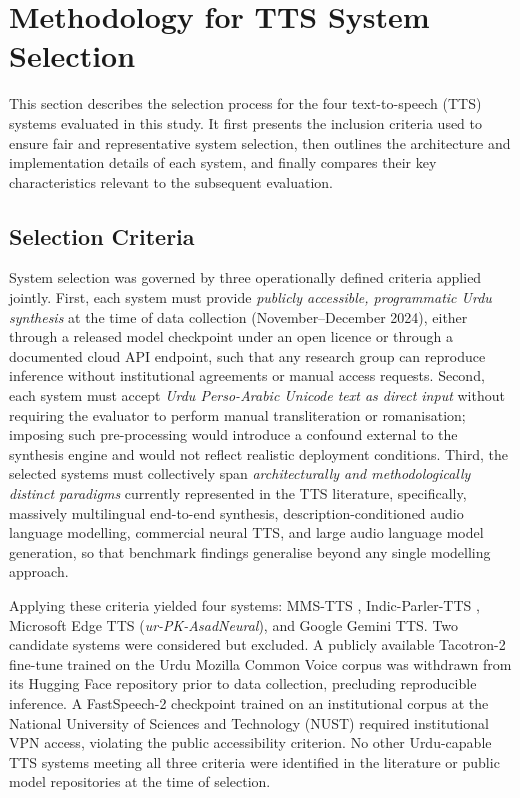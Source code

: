 \documentclass[a4paper,fleqn]{cas-dc}
\begin{document}
    \section{Methodology for TTS System Selection}\label{sec:systems}

    This section describes the selection process for the four text-to-speech (TTS) systems evaluated in this study. It first presents the inclusion criteria used to ensure fair and representative system selection, then outlines the architecture and implementation details of each system, and finally compares their key characteristics relevant to the subsequent evaluation.

    \subsection{Selection Criteria}\label{sec:systems-criteria}
    
    System selection was governed by three operationally defined criteria applied
    jointly. First, each system must provide \emph{publicly accessible, programmatic
    Urdu synthesis} at the time of data collection (November--December 2024), either
    through a released model checkpoint under an open licence or through a documented
    cloud API endpoint, such that any research group can reproduce inference without
    institutional agreements or manual access requests. Second, each system must
    accept \emph{Urdu Perso-Arabic Unicode text as direct input} without requiring
    the evaluator to perform manual transliteration or romanisation; imposing such
    pre-processing would introduce a confound external to the synthesis engine and
    would not reflect realistic deployment conditions. Third, the selected systems
    must collectively span \emph{architecturally and methodologically distinct
    paradigms} currently represented in the TTS literature, specifically,
    massively multilingual end-to-end synthesis, description-conditioned audio
    language modelling, commercial neural TTS, and large audio language model
    generation, so that benchmark findings generalise beyond any single modelling
    approach.
    
    Applying these criteria yielded four systems: MMS-TTS \citep{pratap2023mms},
    Indic-Parler-TTS \citep{lyth2024natural,lacombe2024parlertts}, Microsoft Edge
    TTS (\textit{ur-PK-AsadNeural}), and Google Gemini TTS. Two candidate systems
    were considered but excluded. A publicly available Tacotron-2 fine-tune trained
    on the Urdu Mozilla Common Voice corpus was withdrawn from its Hugging Face
    repository prior to data collection, precluding reproducible inference. A
    FastSpeech-2 checkpoint trained on an institutional corpus at the National
    University of Sciences and Technology (NUST) required institutional VPN access,
    violating the public accessibility criterion. No other Urdu-capable TTS systems
    meeting all three criteria were identified in the literature or public model
    repositories at the time of selection.
    
\end{document}

